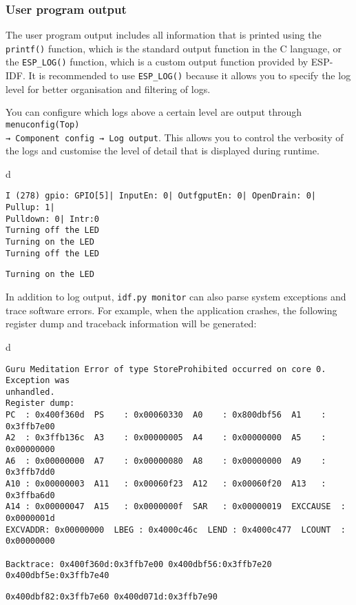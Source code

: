 \documentclass[a4paper,12pt]{book}
\begin{document}
\subsubsection{User program output}
The user program output includes all information that is printed using the \verb|printf()| function, which is the standard output function in the C language, or the \verb|ESP_LOG()| function, which is a custom output function provided by ESP-IDF. It is recommended to use \verb|ESP_LOG()| because it allows you to specify the log level for better organisation and filtering of logs.

You can configure which logs above a certain level are output through \verb|menuconfig(Top) |\\ \verb|→ Component config → Log output|. This allows you to control the verbosity of the logs and customise the level of detail that is displayed during runtime.

\begin{codebloc}
\begin{tabular}{d}
\vspace{2pt}
\begin{verbatim}
I (278) gpio: GPIO[5]| InputEn: 0| OutfgputEn: 0| OpenDrain: 0| Pullup: 1| 
Pulldown: 0| Intr:0 
Turning off the LED
Turning on the LED
Turning off the LED
\end{verbatim}
\verb|Turning on the LED|
\end{tabular}
\end{codebloc}

In addition to log output, \verb|idf.py monitor| can also parse system exceptions and trace software errors. For example, when the application crashes, the following register dump and traceback information will be generated:

\begin{codebloc}
\begin{tabular}{d}
\vspace{2pt}
\begin{verbatim}
Guru Meditation Error of type StoreProhibited occurred on core 0. Exception was 
unhandled.
Register dump:
PC  : 0x400f360d  PS    : 0x00060330  A0    : 0x800dbf56  A1    : 0x3ffb7e00
A2  : 0x3ffb136c  A3    : 0x00000005  A4    : 0x00000000  A5    : 0x00000000
A6  : 0x00000000  A7    : 0x00000080  A8    : 0x00000000  A9    : 0x3ffb7dd0
A10 : 0x00000003  A11   : 0x00060f23  A12   : 0x00060f20  A13   : 0x3ffba6d0
A14 : 0x00000047  A15   : 0x0000000f  SAR   : 0x00000019  EXCCAUSE  : 0x0000001d
EXCVADDR: 0x00000000  LBEG : 0x4000c46c  LEND : 0x4000c477  LCOUNT  : 0x00000000

Backtrace: 0x400f360d:0x3ffb7e00 0x400dbf56:0x3ffb7e20 0x400dbf5e:0x3ffb7e40 
\end{verbatim}
\verb|0x400dbf82:0x3ffb7e60 0x400d071d:0x3ffb7e90|
\end{tabular}
\end{codebloc}
\end{document}
